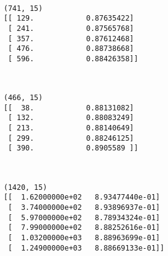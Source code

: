 \documentclass{article}
\begin{document}
    \begin{center}
    \end{center}
    { \hspace*{\fill} \\}
    
    \begin{Verbatim}[commandchars=\\\{\}]
(741, 15)
[[ 129.            0.87635422]
 [ 241.            0.87565768]
 [ 357.            0.87612468]
 [ 476.            0.88738668]
 [ 596.            0.88426358]]
    \end{Verbatim}

    \begin{center}
    \end{center}
    { \hspace*{\fill} \\}
    
    \begin{Verbatim}[commandchars=\\\{\}]
(466, 15)
[[  38.            0.88131082]
 [ 132.            0.88083249]
 [ 213.            0.88140649]
 [ 299.            0.88246125]
 [ 390.            0.8905589 ]]
    \end{Verbatim}

    \begin{center}
    \end{center}
    { \hspace*{\fill} \\}
    
    \begin{Verbatim}[commandchars=\\\{\}]
(1420, 15)
[[  1.62000000e+02   8.93477440e-01]
 [  3.74000000e+02   8.93896937e-01]
 [  5.97000000e+02   8.78934324e-01]
 [  7.99000000e+02   8.88252616e-01]
 [  1.03200000e+03   8.88963699e-01]
 [  1.24900000e+03   8.88669133e-01]]
    \end{Verbatim}

    \begin{center}
    \end{center}
    { \hspace*{\fill} \\}
    
\end{document}
